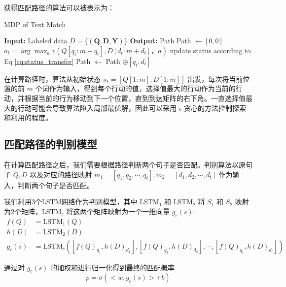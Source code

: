 获得匹配路径的算法可以被表示为：
\begin{algorithm}[!htbp]
    \small
    \caption{MDP of Text Match}\label{alg:MDP_TM}
    \renewcommand{\algorithmicrequire}{\textbf{Input:}}
    \renewcommand{\algorithmicensure}{\textbf{Output:}}
    \begin{algorithmic}
        \STATE \textbf{Input:} Labeled data $D=\{ (\mathbf{Q}, \mathbf{D}, \mathbf{Y}) \}$
        \STATE \textbf{Output:} Path
        \STATE {} Path $\leftarrow [0, 0]$
        \STATE $a_t = \arg\max_a v(Q [q_t:m+q_t], D [d_t:m+d_t]， a)$
        \STATE update status according to Eq \ref{eq:status_transfer}
        \STATE Path $\leftarrow$ Path $\oplus [q_t, d_t]$ 
        \ENDWHILE
    \end{algorithmic}
\end{algorithm}

在计算路径时，算法从初始状态 $s_1 = [Q[1:m], D[1:m]]$ 出发，每次将当前位置的前 $m$ 个词作为输入，得到每个行动的值，选择值最大的行动作为当前的行动，并根据当前的行为移动到下一个位置，直到到达矩阵的右下角。一直选择值最大的行动可能会导致算法陷入局部最优解，因此可以采用 $\epsilon$-贪心的方法控制探索和利用的程度。

\subsection{匹配路径的判别模型}
\label{sec:path_classify}

在计算匹配路径之后，我们需要根据路径判断两个句子是否匹配。判别算法以原句子 $Q, D$ 以及对应的路径映射 $m_1 = [q_1, q_2, \cdots, q_t], m_2 = [d_1, d_2, \cdots, d_t]$ 作为输入，判断两个句子是否匹配。

我们利用3个LSTM网络作为判别模型，其中 LSTM$_1$ 和 LSTM$_2$ 将 $S_1$ 和 $S_2$ 映射为2个矩阵，LSTM$_c$ 将这两个矩阵映射为一个一维向量 $g_c(s)$:
$$
\begin{aligned}
f(Q) &= \text{LSTM}_1(Q) \\
h(D) &= \text{LSTM}_2(D) \\
g_c(s) &= \text{LSTM}_c([{f(Q)}_{q_1}, {h(D)}_{d_1}], [{f(Q)}_{q_2}, {h(D)}_{d_2}], \cdots, [{f(Q)}_{q_t}, {h(D)}_{d_t}])
\end{aligned}
$$

通过对 $g_c(s)$ 的加权和进行归一化得到最终的匹配概率
\begin{equation}
\label{eq:TM_classfiy}
p = \sigma(<w, g_c(s)> + b)
\end{equation}

